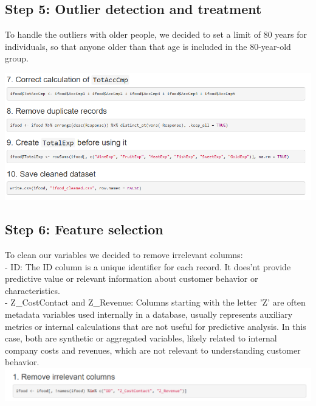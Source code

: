 \subsection{Step 5: Outlier detection and treatment}
To handle the outliers with older people, we decided to set a limit of 80 years for individuals, so that anyone older than that age is included in the 80-year-old group.

\includegraphics[width=\textwidth]{Imatges/pre3.png}
\subsection{Step 6: Feature selection}
 To clean our variables we decided to remove irrelevant columns:\\
 - ID: The ID column is a unique identifier for each record. It does'nt provide predictive value or relevant information about customer behavior or characteristics.\\
 - Z\_CostContact and Z\_Revenue: Columns starting with the letter 'Z' are often metadata variables used internally in a database, usually represents auxiliary metrics or internal calculations that are not useful for predictive analysis. In this case, both are synthetic or aggregated variables, likely related to internal company costs and revenues, which are not relevant to understanding customer behavior. \\
 \includegraphics[width=\textwidth]{Imatges/pre8.png}
